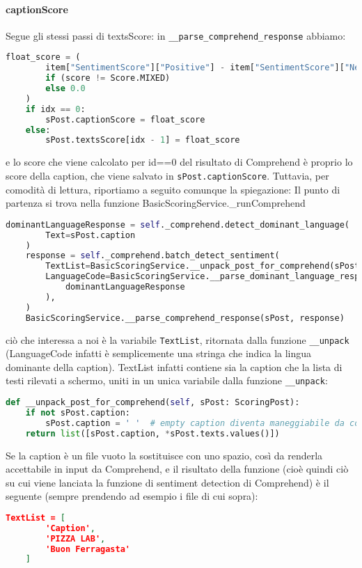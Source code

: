 \paragraph{captionScore}
Segue gli stessi passi di textsScore: in \verb+__parse_comprehend_response+ abbiamo:
\begin{lstlisting}[language=Python]
    float_score = (
        item["SentimentScore"]["Positive"] - item["SentimentScore"]["Negative"]
        if (score != Score.MIXED)
        else 0.0
    )
    if idx == 0:
        sPost.captionScore = float_score
    else:
        sPost.textsScore[idx - 1] = float_score
\end{lstlisting}
e lo score che viene calcolato per id==0 del risultato di Comprehend è proprio lo score della
caption, che viene salvato in \verb+sPost.captionScore+.
Tuttavia, per comodità di lettura, riportiamo a seguito comunque la spiegazione:
Il punto di partenza si trova nella funzione BasicScoringService.\_runComprehend
\begin{lstlisting}[language=Python]
    dominantLanguageResponse = self._comprehend.detect_dominant_language(
        Text=sPost.caption
    )
    response = self._comprehend.batch_detect_sentiment(
        TextList=BasicScoringService.__unpack_post_for_comprehend(sPost),
        LanguageCode=BasicScoringService.__parse_dominant_language_response(
            dominantLanguageResponse
        ),
    )
    BasicScoringService.__parse_comprehend_response(sPost, response)
\end{lstlisting}
ciò che interessa a noi è la variabile \verb+TextList+, ritornata dalla funzione \verb+__unpack+ 
(LanguageCode infatti è semplicemente una stringa che indica la lingua dominante della caption).
TextList infatti contiene sia la caption che la lista di testi rilevati a schermo, uniti in un
unica variabile dalla funzione \verb+__unpack+:
\begin{lstlisting}[language=Python]
def __unpack_post_for_comprehend(self, sPost: ScoringPost):
    if not sPost.caption:
        sPost.caption = ' '  # empty caption diventa maneggiabile da comprehend
    return list([sPost.caption, *sPost.texts.values()])
\end{lstlisting}
Se la caption è un file vuoto la sostituisce con uno spazio, così da renderla accettabile in input
da Comprehend, e il risultato della funzione (cioè quindi ciò su cui viene lanciata la funzione di
sentiment detection di Comprehend) è il seguente (sempre prendendo ad esempio i file di cui sopra):
\begin{lstlisting}[language=JSON]
    TextList = [
        'Caption',
        'PIZZA LAB',
        'Buon Ferragasta'
    ]
\end{lstlisting}
